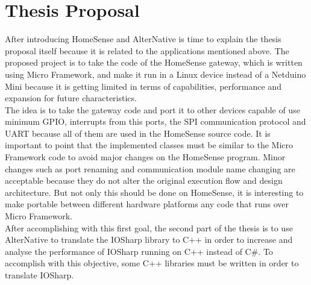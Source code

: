 \section{Thesis Proposal}\label{S:Proposal-Thesis-Proposal}
After introducing HomeSense and AlterNative is time to explain the thesis proposal itself because it is related to the applications mentioned above. The proposed project is to take the code of the HomeSense gateway, which is written using Micro Framework, and make it run in a Linux device instead of a Netduino Mini because it is getting limited in terms of capabilities, performance and expansion for future characteristics.
\\
The idea is to take the gateway code and port it to other devices capable of use minimum GPIO, interrupts from this ports, the SPI communication protocol and UART because all of them are used in the HomeSense source code. It is important to point that the implemented classes must be similar to the Micro Framework code to avoid major changes on the HomeSense program. Minor changes such as port renaming and communication module name changing are acceptable because they do not alter the original execution flow and design architecture. But not only this should be done on HomeSense, it is interesting to make portable between different hardware platforms any code that runs over Micro Framework.
\\
After accomplishing with this first goal, the second part of the thesis is to use AlterNative to translate the IOSharp library to C++ in order to increase and analyse the performance of IOSharp running on C++ instead of C\#. To accomplish with this objective, some C++ libraries must be written in order to translate IOSharp.